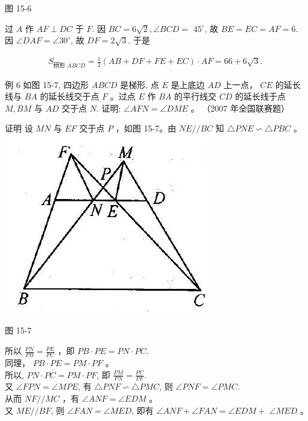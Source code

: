 \documentclass[10pt]{article}
\begin{document}
图 15-6

过 $A$ 作 $A F \perp D C$ 于 $F$. 因 $B C=6 \sqrt{2}, \angle B C D=$ $45^{\circ}$, 故 $B E=E C=A F=6$. 因 $\angle D A F=\angle 30^{\circ}$, 故 $D F=2 \sqrt{3}$. 于是

\begin{align*}
S_{\text {䄯形 } A B C D}=\frac{1}{2}(A B+D F+F E+E C) \cdot A F=66+6 \sqrt{3} \text {. }
\end{align*}

例 6 如图 15-7, 四边形 $A B C D$ 是梯形, 点 $E$ 是上底边 $A D$ 上一点， $C E$ 的延长线与 $B A$ 的延长线交于点 $F$ 。过点 $E$ 作 $B A$ 的平行线交 $C D$ 的延长线于点 $M, B M$ 与 $A D$ 交于点 $N$. 证明: $\angle A F N=\angle D M E$ 。 （2007 年全国联赛题）

证明 设 $M N$ 与 $E F$ 交于点 $P$ ，如图 15-7。由 $N E / / B C$ 知 $\triangle P N E \backsim \triangle P B C$ 。\\
\includegraphics[max width=\textwidth, center]{2024_10_30_2c8f45efd4a519b08e1ag-140(2)}

图 15-7

所以 $\frac{P N}{P B}=\frac{P E}{P C}$ ，即 $P B \cdot P E=P N \cdot P C$.\\
同理， $P B \cdot P E=P M \cdot P F$ 。\\
所以, $P N \cdot P C=P M \cdot P F$, 即 $\frac{P M}{P N}=\frac{P C}{P F}$.\\
又 $\angle F P N=\angle M P E$, 有 $\triangle P N F \backsim \triangle P M C$, 则 $\angle P N F=\angle P M C$.\\
从而 $N F / / M C$ ，有 $\angle A N F=\angle E D M$ 。\\
又 $M E / / B F$, 则 $\angle F A N=\angle M E D$, 即有 $\angle A N F+\angle F A N=\angle E D M+$ $\angle M E D$ 。
\end{document}
